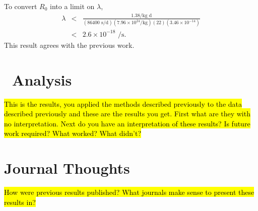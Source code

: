 \documentclass[groupedaddress,rmp,amsmath,amssymb,bibnotes,altaffilletter,twocolumn]{revtex4-1}
\newcommand{\hlc}[2][yellow]{ {\sethlcolor{#1} \hl{#2}} }
\begin{document}
To convert $R_0$ into a limit on $\lambda$,
%
\begin{eqnarray}
\lambda & < & \frac{1.38 \mbox{/kg d}}{(86400 \mbox{ s/d}) (7.96\times10^{24} \mbox{/kg}) (22) (3.46\times10^{-14})}\nonumber  \\ 
 & < & 2.6\times10^{-18} \mbox{ /s}.
\label{eqn:LamLimit}
\end{eqnarray}
%
This result agrees with the previous work.

\lipsum[3-3]

\section{\MJ\ Analysis}
\hlc[blueh]{This is the results, you applied the methods described previously to the data described previously and these are the results you get. First what are they with no interpretation. Next do you have an interpretation of these results? Is future work required? What worked? What didn't?
}

\lipsum[4-4]

\section{Journal Thoughts}
\hlc[blueh]{How were previous results published? What journals make sense to present these results in?}


\end{document}
